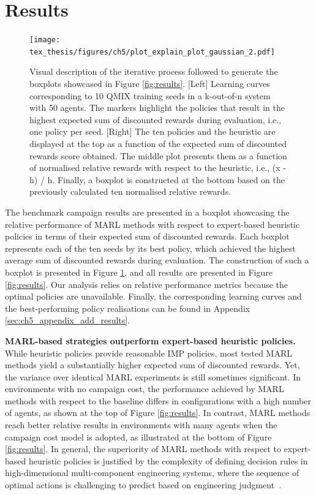 \section{Results}\label{sec:ch5_results}

\begin{figure}
    \centering
    \texttt{[image: tex\_thesis/figures/ch5/plot\_explain\_plot\_gaussian\_2.pdf]}
    \caption{Visual description of the iterative process followed to generate the boxplots showcased in Figure \ref{fig:results}.
[Left] Learning curves corresponding to 10 QMIX training seeds in a k-out-of-n system with 50 agents. 
The markers highlight the policies that result in the highest expected sum of discounted rewards during evaluation, i.e., one policy per seed.
[Right] The ten policies and the heuristic are displayed at the top as a function of the expected sum of discounted rewards score obtained.
The middle plot presents them as a function of normalised relative rewards with respect to the heuristic, i.e., (x - h) / h.
Finally, a boxplot is constructed at the bottom based on the previously calculated ten normalised relative rewards.
}
\label{fig:explain_fig}
\end{figure}

The benchmark campaign results are presented in a boxplot showcasing the relative performance of MARL methods with respect to expert-based heuristic policies in terms of their expected sum of discounted rewards.
Each boxplot represents each of the ten seeds by its best policy, which achieved the highest average sum of discounted rewards during evaluation.
The construction of such a boxplot is presented in Figure \ref{fig:explain_fig}, and all results are presented in Figure \ref{fig:results}.
Our analysis relies on relative performance metrics because the optimal policies are unavailable.
Finally, the corresponding learning curves and the best-performing policy realisations can be found in Appendix \ref{sec:ch5_appendix_add_results}.

\textbf{MARL-based strategies outperform expert-based heuristic policies.}
While heuristic policies provide reasonable IMP policies, most tested MARL methods yield a substantially higher expected sum of discounted rewards. 
Yet, the variance over identical MARL experiments is still sometimes significant.
In environments with no campaign cost, the performance achieved by MARL methods with respect to the baseline differs in configurations with a high number of agents, as shown at the top of Figure \ref{fig:results}.
In contrast, MARL methods reach better relative results in environments with many agents when the campaign cost model is adopted, as illustrated at the bottom of Figure \ref{fig:results}.
In general, the superiority of MARL methods with respect to expert-based heuristic policies is justified by the complexity of defining decision rules in high-dimensional multi-component engineering systems, where the sequence of optimal actions is challenging to predict based on engineering judgment~\citep{morato2022syst}.




